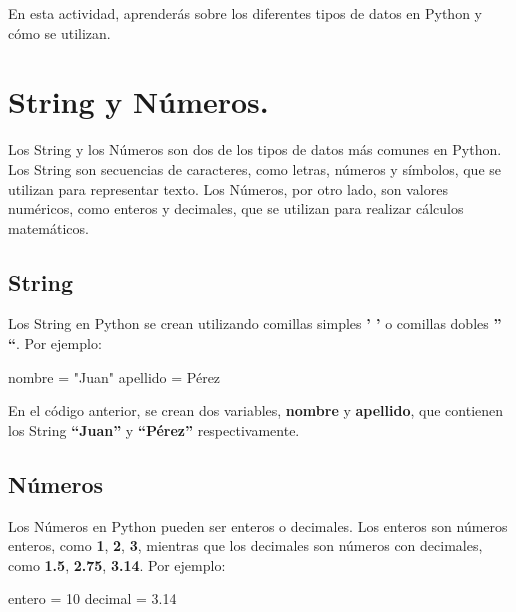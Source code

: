 \documentclass[
  a4paper,
  DIV=11,
  numbers=noendperiod,
  onepage,
  openany]{scrreprt}
\newenvironment{Shaded}{\begin{snugshade}}{\end{snugshade}}
\newcommand{\DecValTok}[1]{\textcolor[rgb]{0.68,0.00,0.00}{#1}}
\newcommand{\FloatTok}[1]{\textcolor[rgb]{0.68,0.00,0.00}{#1}}
\newcommand{\NormalTok}[1]{\textcolor[rgb]{0.00,0.23,0.31}{#1}}
\newcommand{\OperatorTok}[1]{\textcolor[rgb]{0.37,0.37,0.37}{#1}}
\newcommand{\StringTok}[1]{\textcolor[rgb]{0.13,0.47,0.30}{#1}}
\begin{document}
En esta actividad, aprenderás sobre los diferentes tipos de datos en
Python y cómo se utilizan.

\section{String y Números.}\label{string-y-nuxfameros.}

Los String y los Números son dos de los tipos de datos más comunes en
Python. Los String son secuencias de caracteres, como letras, números y
símbolos, que se utilizan para representar texto. Los Números, por otro
lado, son valores numéricos, como enteros y decimales, que se utilizan
para realizar cálculos matemáticos.

\subsection{String}\label{string}

Los String en Python se crean utilizando comillas simples \textbf{' '} o
comillas dobles \textbf{'' ``}. Por ejemplo:

\begin{Shaded}
\begin{Highlighting}[]
\NormalTok{nombre }\OperatorTok{=} \StringTok{"Juan"}
\NormalTok{apellido }\OperatorTok{=} \StringTok{\textquotesingle{}Pérez\textquotesingle{}}
\end{Highlighting}
\end{Shaded}

En el código anterior, se crean dos variables, \textbf{nombre} y
\textbf{apellido}, que contienen los String \textbf{``Juan''} y
\textbf{``Pérez''} respectivamente.

\subsection{Números}\label{nuxfameros}

Los Números en Python pueden ser enteros o decimales. Los enteros son
números enteros, como \textbf{1}, \textbf{2}, \textbf{3}, mientras que
los decimales son números con decimales, como \textbf{1.5},
\textbf{2.75}, \textbf{3.14}. Por ejemplo:

\begin{Shaded}
\begin{Highlighting}[]
\NormalTok{entero }\OperatorTok{=} \DecValTok{10}
\NormalTok{decimal }\OperatorTok{=} \FloatTok{3.14}
\end{Highlighting}
\end{Shaded}
\end{document}
